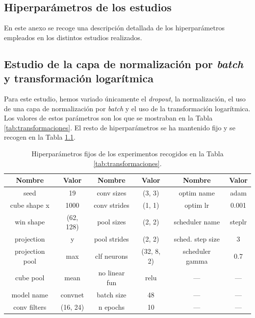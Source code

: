 \documentclass[a4paper,12pt,oneside,titlepage]{book}
\begin{document}




\newpage

\begin{appendices}

\chapter{Hiperparámetros de los estudios}
En este anexo se recoge una descripción detallada de los hiperparámetros empleados en los distintos estudios realizados.

  \section{Estudio de la capa de normalización por \textit{batch} y transformación logarítmica}
\label{an:1}

Para este estudio, hemos variado únicamente el \textit{dropout}, la normalización, el uso de una capa de normalización por \textit{batch} y el uso de la transformación logarítmica. Los valores de estos parámetros son los que se mostraban en la Tabla \ref{tab:transformaciones}. El resto de hiperparámetros se ha mantenido fijo y se recogen en la Tabla \ref{tab:anexo_transformaciones}.

  \begin{table}[h!]
    \centering
    \begin{tabular}{|c|c||c|c||c|c|}
    \hline
    Nombre          & Valor    & Nombre        & Valor      & Nombre           & Valor  \\ \hline\hline
    seed         & 19       & conv sizes    & (3, 3)     & optim name       & adam   \\ \hline
    cube shape x    & 1000     & conv strides  & (1, 1)     & optim lr         & 0.001  \\ \hline
    win shape       & (62, 128)  & pool sizes    & (2, 2)     & scheduler name   & steplr \\ \hline
    projection      & y        & pool strides  & (2, 2)     & sched. step size & 3      \\ \hline
    projection pool & max      & clf neurons   & (32, 8, 2) & scheduler gamma  & 0.7    \\ \hline
    cube pool       & mean     & no linear fun & relu       & ---              & ---    \\ \hline
    model name      & convnet  & batch size    & 48         & ---              & ---    \\ \hline
    conv filters    & (16, 24) & n epochs      & 10         & ---              & ---    \\ \hline
    \end{tabular}
    \caption{Hiperparámetros fijos de los experimentos recogidos en la Tabla \ref{tab:transformaciones}.}
    \label{tab:anexo_transformaciones}
  \end{table}


\end{appendices}
\end{document}
